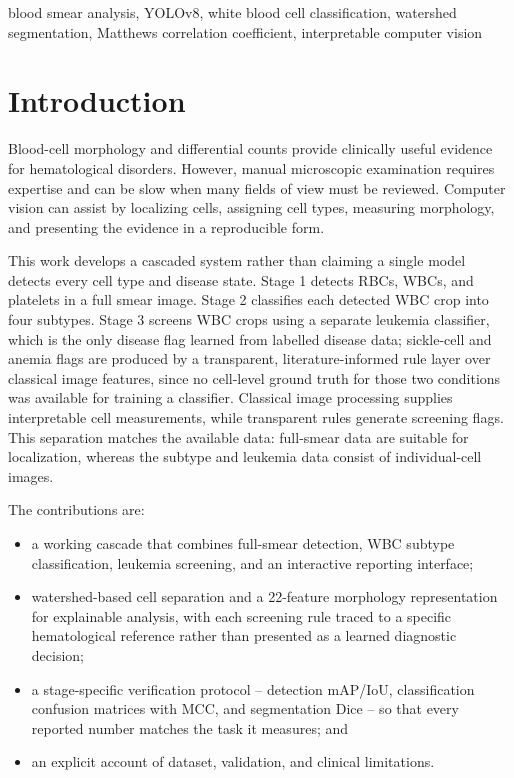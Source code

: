 \documentclass[conference]{IEEEtran}
\begin{document}
\begin{IEEEkeywords}
blood smear analysis, YOLOv8, white blood cell classification, watershed segmentation, Matthews correlation coefficient, interpretable computer vision
\end{IEEEkeywords}

\section{Introduction}

Blood-cell morphology and differential counts provide clinically useful evidence for hematological disorders. However, manual microscopic examination requires expertise and can be slow when many fields of view must be reviewed. Computer vision can assist by localizing cells, assigning cell types, measuring morphology, and presenting the evidence in a reproducible form.

This work develops a cascaded system rather than claiming a single model detects every cell type and disease state. Stage 1 detects RBCs, WBCs, and platelets in a full smear image. Stage 2 classifies each detected WBC crop into four subtypes. Stage 3 screens WBC crops using a separate leukemia classifier, which is the only disease flag learned from labelled disease data; sickle-cell and anemia flags are produced by a transparent, literature-informed rule layer over classical image features, since no cell-level ground truth for those two conditions was available for training a classifier. Classical image processing supplies interpretable cell measurements, while transparent rules generate screening flags. This separation matches the available data: full-smear data are suitable for localization, whereas the subtype and leukemia data consist of individual-cell images.

The contributions are:
\begin{itemize}
\item a working cascade that combines full-smear detection, WBC subtype classification, leukemia screening, and an interactive reporting interface;
\item watershed-based cell separation and a 22-feature morphology representation for explainable analysis, with each screening rule traced to a specific hematological reference rather than presented as a learned diagnostic decision;
\item a stage-specific verification protocol -- detection mAP/IoU, classification confusion matrices with MCC, and segmentation Dice -- so that every reported number matches the task it measures; and
\item an explicit account of dataset, validation, and clinical limitations.
\end{itemize}
\end{document}
